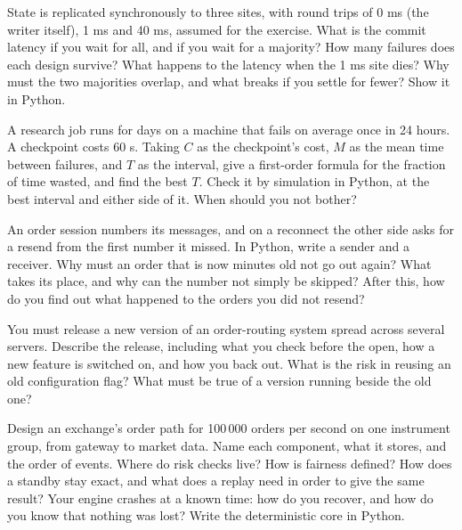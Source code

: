 \begin{question}\label{iq:iv3:system-design:34}
State is replicated synchronously to three sites, with round trips of 0 ms (the writer itself), 1 ms and 40 ms, assumed for the exercise. What is the commit latency if you wait for all, and if you wait for a majority? How many failures does each design survive? What happens to the latency when the 1 ms site dies? Why must the two majorities overlap, and what breaks if you settle for fewer? Show it in Python.
\end{question}

\begin{question}\label{iq:iv3:system-design:35}
A research job runs for days on a machine that fails on average once in 24 hours. A checkpoint costs 60 s. Taking $C$ as the checkpoint's cost, $M$ as the mean time between failures, and $T$ as the interval, give a first-order formula for the fraction of time wasted, and find the best $T$. Check it by simulation in Python, at the best interval and either side of it. When should you not bother?
\end{question}

\begin{question}\label{iq:iv3:system-design:36}
An order session numbers its messages, and on a reconnect the other side asks for a resend from the first number it missed. In Python, write a sender and a receiver. Why must an order that is now minutes old not go out again? What takes its place, and why can the number not simply be skipped? After this, how do you find out what happened to the orders you did not resend?
\end{question}

\begin{question}\label{iq:iv3:system-design:37}
You must release a new version of an order-routing system spread across several servers. Describe the release, including what you check before the open, how a new feature is switched on, and how you back out. What is the risk in reusing an old configuration flag? What must be true of a version running beside the old one?
\end{question}

\begin{question}\label{iq:iv3:system-design:38}
Design an exchange's order path for 100\,000 orders per second on one instrument group, from gateway to market data. Name each component, what it stores, and the order of events. Where do risk checks live? How is fairness defined? How does a standby stay exact, and what does a replay need in order to give the same result? Your engine crashes at a known time: how do you recover, and how do you know that nothing was lost? Write the deterministic core in Python.
\end{question}

